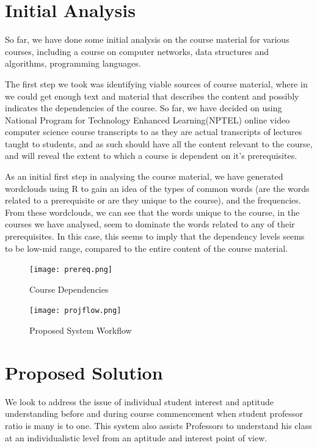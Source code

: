 \documentclass[conference]{IEEEtran}
\begin{document}
	\section{Initial Analysis}
So far, we have done some initial analysis on the course material for various courses, including a course on computer networks, data structures and algorithms, programming languages.

The first step we took was identifying viable sources of course material, where in we could get enough text and material that describes the content and possibly indicates the dependencies of the course. So far, we have decided on using National Program for Technology Enhanced Learning(NPTEL)\cite{nptel} online video computer science course transcripts to as they are actual transcripts of lectures taught to students, and as such should have all the content relevant to the course, and will reveal the extent to which a course is dependent on it's prerequisites.

As an initial first step in analysing the course material, we have generated wordclouds using R\cite{r} to gain an idea of the types of common words (are the words related to a prerequisite or are they unique to the course), and the frequencies. From these wordclouds, we can see that the words unique to the course, in the courses we have analysed, seem to dominate the words related to any of their prerequisites. In this case, this seems to imply that the dependency levels seems to be low-mid range, compared to the entire content of the course material.

\begin{figure}
	\texttt{[image: prereq.png]}
	\caption{Course Dependencies}
	\label{fig:prereq}
\end{figure}
\begin{figure}
	\texttt{[image: projflow.png]}
	\caption{Proposed System Workflow}
	\label{fig:projflow}
\end{figure}
	\section{Proposed Solution}
We look to address the issue of individual student interest and aptitude understanding before and during course commencement when student professor ratio is many is to one. This system also assists Professors to understand his class at an individualistic level from an aptitude and interest point of view.
\end{document}
